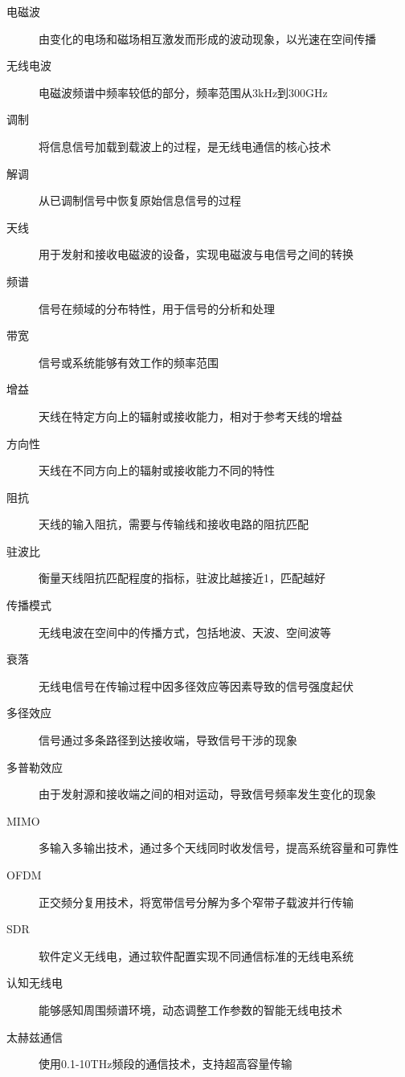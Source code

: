 \documentclass[12pt,UTF8]{ctexbook}
\begin{document}
\begin{description}
    \item[电磁波] 由变化的电场和磁场相互激发而形成的波动现象，以光速在空间传播
    \item[无线电波] 电磁波频谱中频率较低的部分，频率范围从3kHz到300GHz
    \item[调制] 将信息信号加载到载波上的过程，是无线电通信的核心技术
    \item[解调] 从已调制信号中恢复原始信息信号的过程
    \item[天线] 用于发射和接收电磁波的设备，实现电磁波与电信号之间的转换
    \item[频谱] 信号在频域的分布特性，用于信号的分析和处理
    \item[带宽] 信号或系统能够有效工作的频率范围
    \item[增益] 天线在特定方向上的辐射或接收能力，相对于参考天线的增益
    \item[方向性] 天线在不同方向上的辐射或接收能力不同的特性
    \item[阻抗] 天线的输入阻抗，需要与传输线和接收电路的阻抗匹配
    \item[驻波比] 衡量天线阻抗匹配程度的指标，驻波比越接近1，匹配越好
    \item[传播模式] 无线电波在空间中的传播方式，包括地波、天波、空间波等
    \item[衰落] 无线电信号在传输过程中因多径效应等因素导致的信号强度起伏
    \item[多径效应] 信号通过多条路径到达接收端，导致信号干涉的现象
    \item[多普勒效应] 由于发射源和接收端之间的相对运动，导致信号频率发生变化的现象
    \item[MIMO] 多输入多输出技术，通过多个天线同时收发信号，提高系统容量和可靠性
    \item[OFDM] 正交频分复用技术，将宽带信号分解为多个窄带子载波并行传输
    \item[SDR] 软件定义无线电，通过软件配置实现不同通信标准的无线电系统
    \item[认知无线电] 能够感知周围频谱环境，动态调整工作参数的智能无线电技术
    \item[太赫兹通信] 使用0.1-10THz频段的通信技术，支持超高容量传输
\end{description}

\printindex
\end{document}
